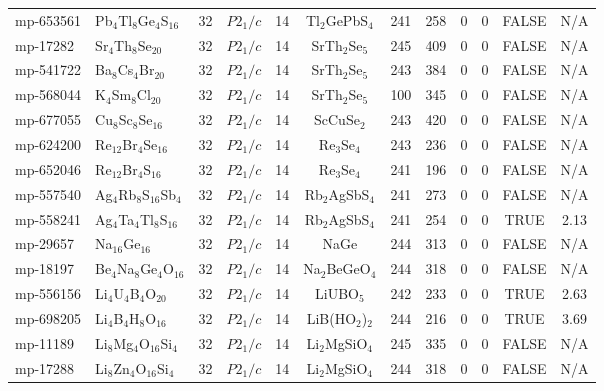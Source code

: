 {\begin{longtable}{llcccccccccc}
    mp-653561 & Pb$_{4}$Tl$_{8}$Ge$_{4}$S$_{16}$ & 32    & $P2_1/c$ & 14    & Tl$_{2}$GePbS$_{4}$ & 241   & 258   & 0     & 0     & FALSE & N/A \\
    mp-17282 & Sr$_{4}$Th$_{8}$Se$_{20}$ & 32    & $P2_1/c$ & 14    & SrTh$_{2}$Se$_{5}$ & 245   & 409   & 0     & 0     & FALSE & N/A \\
    mp-541722 & Ba$_{8}$Cs$_{4}$Br$_{20}$ & 32    & $P2_1/c$ & 14    & SrTh$_{2}$Se$_{5}$ & 243   & 384   & 0     & 0     & FALSE & N/A \\
    mp-568044 & K$_{4}$Sm$_{8}$Cl$_{20}$ & 32    & $P2_1/c$ & 14    & SrTh$_{2}$Se$_{5}$ & 100   & 345   & 0     & 0     & FALSE & N/A \\
    mp-677055 & Cu$_{8}$Sc$_{8}$Se$_{16}$ & 32    & $P2_1/c$ & 14    & ScCuSe$_{2}$ & 243   & 420   & 0     & 0     & FALSE & N/A \\
    mp-624200 & Re$_{12}$Br$_{4}$Se$_{16}$ & 32    & $P2_1/c$ & 14    & Re$_{3}$Se$_{4}$ & 243   & 236   & 0     & 0     & FALSE & N/A \\
    mp-652046 & Re$_{12}$Br$_{4}$S$_{16}$ & 32    & $P2_1/c$ & 14    & Re$_{3}$Se$_{4}$ & 241   & 196   & 0     & 0     & FALSE & N/A \\
    mp-557540 & Ag$_{4}$Rb$_{8}$S$_{16}$Sb$_{4}$ & 32    & $P2_1/c$ & 14    & Rb$_{2}$AgSbS$_{4}$ & 241   & 273   & 0     & 0     & FALSE & N/A \\
    mp-558241 & Ag$_{4}$Ta$_{4}$Tl$_{8}$S$_{16}$ & 32    & $P2_1/c$ & 14    & Rb$_{2}$AgSbS$_{4}$ & 241   & 254   & 0     & 0     & TRUE  & 2.13  \\
    mp-29657 & Na$_{16}$Ge$_{16}$ & 32    & $P2_1/c$ & 14    & NaGe  & 244   & 313   & 0     & 0     & FALSE & N/A \\
    mp-18197 & Be$_{4}$Na$_{8}$Ge$_{4}$O$_{16}$ & 32    & $P2_1/c$ & 14    & Na$_{2}$BeGeO$_{4}$ & 244   & 318   & 0     & 0     & FALSE & N/A \\
    mp-556156 & Li$_{4}$U$_{4}$B$_{4}$O$_{20}$ & 32    & $P2_1/c$ & 14    & LiUBO$_{5}$ & 242   & 233   & 0     & 0     & TRUE  & 2.63  \\
    mp-698205 & Li$_{4}$B$_{4}$H$_{8}$O$_{16}$ & 32    & $P2_1/c$ & 14    & LiB(HO$_{2}$)$_{2}$ & 244   & 216   & 0     & 0     & TRUE  & 3.69  \\
    mp-11189 & Li$_{8}$Mg$_{4}$O$_{16}$Si$_{4}$ & 32    & $P2_1/c$ & 14    & Li$_{2}$MgSiO$_{4}$ & 245   & 335   & 0     & 0     & FALSE & N/A \\
    mp-17288 & Li$_{8}$Zn$_{4}$O$_{16}$Si$_{4}$ & 32    & $P2_1/c$ & 14    & Li$_{2}$MgSiO$_{4}$ & 244   & 318   & 0     & 0     & FALSE & N/A \\

\end{longtable}}
